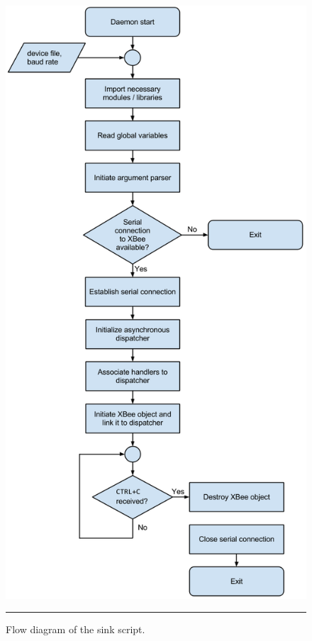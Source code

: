 \begin{figure}[htbp]
    \centering
        \includegraphics[scale=0.35]{./Figures/sindia.png}
        \rule{35em}{0.5pt}
    \caption[Flow diagram of the sink script]{Flow diagram of the sink script.}
    \label{fig:sindia}
\end{figure}

